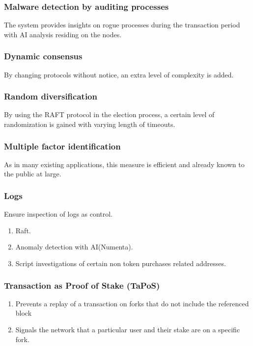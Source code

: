 \documentclass[]{article}
\begin{document}
{\subsubsection{Malware detection by auditing processes}
The system provides insights on rogue processes during the transaction period with AI analysis residing on the nodes. 
\subsubsection{Dynamic consensus}
By changing protocols without notice, an extra level of complexity is added.
\subsubsection{Random diversification}
By using the RAFT protocol in the election process, a certain level of randomization is gained with varying length of timeouts.
\subsubsection{Multiple factor identification}
As in many existing applications, this measure is efficient and already known to the public at large.
\subsubsection {Logs}
Ensure inspection of logs as control.
\begin{enumerate}
	\item Raft.
	\item Anomaly detection with AI(Numenta).
	\item Script investigations of certain non token purchases related addresses.
\end{enumerate}
\subsubsection{Transaction as Proof of Stake (TaPoS)}
\begin{enumerate}
	\item Prevents a replay of a transaction on forks that do not include the referenced block 
	\item Signals the network that a particular user and their stake are on a specific fork.
\end{enumerate}
}
\end{document}
